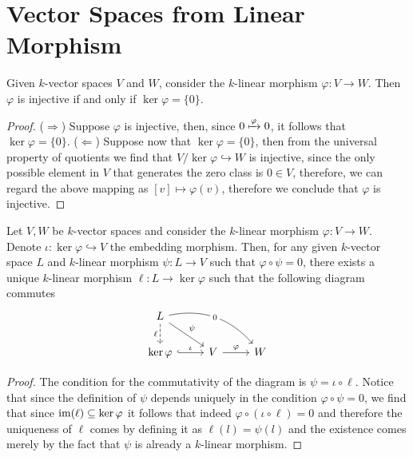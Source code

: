 \section{Vector Spaces from Linear Morphism}

\begin{proposition}
  Given \(k\)-vector spaces \(V\) and \(W\), consider the \(k\)-linear morphism
  \(\varphi : V \to W\). Then \(\varphi\) is injective if and only if \(\ker
  \varphi = \{0\}\).
\end{proposition}

\begin{proof}
  (\(\Rightarrow\)) Suppose \(\varphi\) is injective, then, since \(0 \xmapsto
  \varphi 0\), it follows that \(\ker \varphi = \{0\}\). (\(\Leftarrow\))
  Suppose now that \(\ker \varphi = \{0\}\), then from the universal property
  of quotients we find that \(V/\ker \varphi \hookrightarrow W\) is injective,
  since the only possible element in \(V\) that generates the zero class is \(0
  \in V\), therefore, we can regard the above mapping as \([v] \mapsto
  \varphi(v)\), therefore we conclude that \(\varphi\) is injective.
\end{proof}

\begin{theorem}
  Let \(V, W\) be \(k\)-vector spaces and consider the \(k\)-linear morphism
  \(\varphi : V \to W\). Denote \(\iota : \ker \varphi \hookrightarrow V\) the
  embedding morphism. Then, for any given \(k\)-vector space \(L\) and
  \(k\)-linear morphism \(\psi : L \to V\) such that \(\varphi \circ \psi = 0\),
  there exists a unique \(k\)-linear morphism \(\ell : L \to \ker \varphi\) such
  that the following diagram commutes
  \[
    \begin{tikzcd}
      L \ar[d, dashed, swap, "\ell"] \ar[dr, "\psi"] \ar[drr, bend left,
      "0" description] & & \\
      \ker \varphi \ar[r, hookrightarrow, "\iota"] &V \ar[r, "\varphi"] &W
    \end{tikzcd}
  \] 
\end{theorem}

\begin{proof}
  The condition for the commutativity of the diagram is \(\psi = \iota \circ
  \ell\). Notice that since the definition of \(\psi\) depends uniquely in the
  condition \(\varphi \circ \psi = 0\), we find that since \(\operatorname{im}(\ell)
  \subseteq \ker \varphi\) it follows that indeed \(\varphi \circ (\iota \circ
  \ell) = 0\) and therefore the uniqueness of \(\ell\) comes by defining it as
  \(\ell(l) = \psi(l)\) and the existence comes merely by the fact that \(\psi\) 
  is already a \(k\)-linear morphism.
\end{proof}

